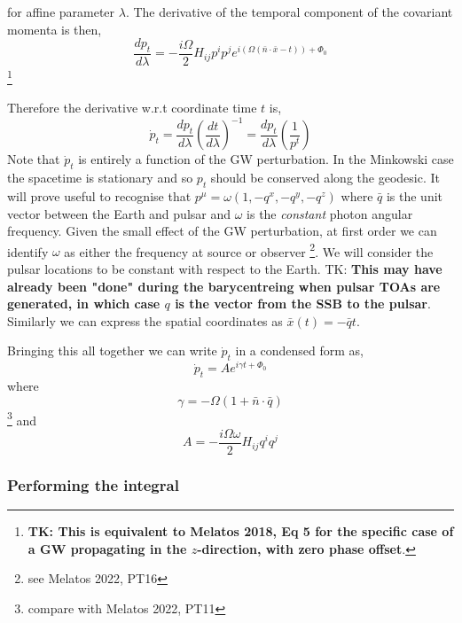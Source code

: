\documentclass[fleqn,usenatbib,useAMS]{mnras}
\begin{document}
\noindent for affine parameter $\lambda$. The derivative of the temporal component of the covariant momenta is then,
\begin{equation}
	\frac{d p_{t}}{d \lambda} = -\frac{i\Omega}{2} H_{ij}p^i p^j  e^{i(\Omega(\bar{n}\cdot \bar{x} - t))+\Phi_0}
\end{equation}
\footnote{\textbf{TK: This is equivalent to Melatos 2018, Eq 5 for the specific case of a GW propagating in the $z$-direction, with zero phase offset}.}


\noindent Therefore the derivative w.r.t coordinate time $t$ is,
\begin{equation}
	\dot{p}_t = \frac{d p_{t}}{d \lambda} \left(\frac{dt}{d\lambda}\right)^{-1} = \frac{d p_{t}}{d \lambda} \left(\frac{1}{p^t}\right)
\end{equation}
\noindent Note that $\dot{p}_t$ is entirely a function of the GW perturbation. In the Minkowski case the spacetime is stationary and so $p_t$ should be conserved along the geodesic. It will prove useful to recognise that $p^{\mu} = \omega(1,-q^x,-q^y,-q^z)$ where $\bar{q}$ is the unit vector between the Earth and pulsar and $\omega$ is the \textit{constant} photon angular frequency. Given the small effect of the GW perturbation, at first order we can identify $\omega$ as either the frequency at source or observer \footnote{see Melatos 2022, PT16}. We will consider  the pulsar locations to be constant with respect to the Earth. TK: \textbf{This may have already been "done" during the barycentreing when pulsar TOAs are generated, in which case $q$ is the vector from the SSB to the pulsar}. Similarly we can express the spatial coordinates as $\bar{x}(t) = -\bar{q}t$. \newline  


\noindent Bringing this all together we can write $\dot{p}_t$ in a condensed form as,
\begin{equation}
	\dot{p}_t = A e^{i \gamma t + \Phi_0}
\end{equation}
where 
\begin{equation}
	\gamma = -\Omega (1 + \bar{n}\cdot \bar{q}) 
\end{equation}
\footnote{compare with Melatos 2022, PT11}
\noindent and
\begin{equation}
	A = -\frac{i\Omega \omega}{2} H_{ij}q^i q^j 
\end{equation}

\subsubsection{Performing the integral}
\end{document}
